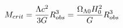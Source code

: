 \documentclass[preview]{standalone}
\begin{document}
\begin{align*}
\special{dvisvgm:raw <g id='unique000'>}M_{crit} = \frac{\Lambda c^2}{3G}R_{obs}^3 = \frac{\Omega_{\Lambda 0}H_0^2}{G}R_{obs}^3\special{dvisvgm:raw </g>}
\end{align*}
\end{document}
